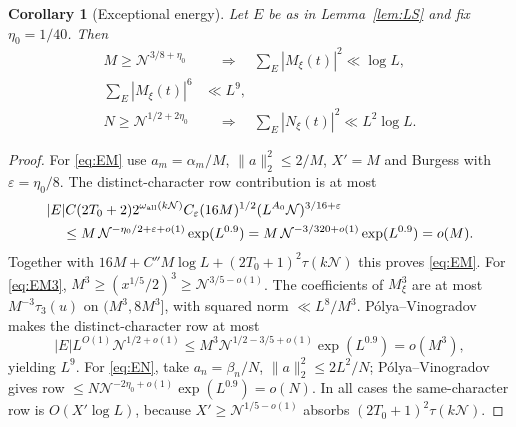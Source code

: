 \documentclass[11pt]{article}
\newtheorem{corollary}[theorem]{Corollary}
\theoremstyle{definition}
\newcommand{\GN}{\mathcal N}
\theoremstyle{remark}
\numberwithin{equation}{section}
\begin{document}
\begin{corollary}[Exceptional energy]\label{cor:exceptional-energy}
Let $E$ be as in Lemma~\ref{lem:LS} and fix $\eta_0=1/40$.
Then
\begin{align}
 M\ge\GN^{3/8+\eta_0}&\quad\Longrightarrow\quad
        \sum_E|M_\xi(t)|^2\ll\log L,\label{eq:EM}\\
 \sum_E|M_\xi(t)|^6&\ll L^9,\label{eq:EM3}\\
 N\ge\GN^{1/2+2\eta_0}&\quad\Longrightarrow\quad
        \sum_E|N_\xi(t)|^2\ll L^2\log L.\label{eq:EN}
\end{align}
\end{corollary}
\begin{proof}
For \eqref{eq:EM} use $a_m=\alpha_m/M$,
$\|a\|_2^2\le2/M$, $X'=M$ and Burgess with
$\varepsilon=\eta_0/8$.
The distinct-character row contribution is at most
\begin{equation}\label{eq:EM-margin}
 \begin{split}
 &|E|C(2T_0+2)2^{\omega_{\rm all}(k\GN)}
       C_\varepsilon(16M)^{1/2}(L^{A_0}\GN)^{3/16+\varepsilon}\\
 &\hspace{4mm}\le M\,\GN^{-\eta_0/2+\varepsilon+o(1)}
                      \exp(L^{0.9})
   =M\,\GN^{-3/320+o(1)}\exp(L^{0.9})=o(M).
 \end{split}
\end{equation}
Together with $16M+C''M\log L+(2T_0+1)^2\tau(k\GN)$ this proves
\eqref{eq:EM}.
For \eqref{eq:EM3},
$M^3\ge(x^{1/5}/2)^3\ge\GN^{3/5-o(1)}$.
The coefficients of $M_\xi^3$ are at most $M^{-3}\tau_3(u)$ on
$(M^3,8M^3]$, with squared norm $\ll L^8/M^3$.
P\'olya--Vinogradov makes the distinct-character row at most
\[
 |E|L^{O(1)}\GN^{1/2+o(1)}
 \le M^3\GN^{1/2-3/5+o(1)}\exp(L^{0.9})=o(M^3),
\]
yielding $L^9$.
For \eqref{eq:EN}, take $a_n=\beta_n/N$,
$\|a\|_2^2\le2L^2/N$; P\'olya--Vinogradov gives row
$\le N\GN^{-2\eta_0+o(1)}\exp(L^{0.9})=o(N)$.
In all cases the same-character row is $O(X'\log L)$, because
$X'\ge\GN^{1/5-o(1)}$ absorbs $(2T_0+1)^2\tau(k\GN)$.
\end{proof}
\end{document}
